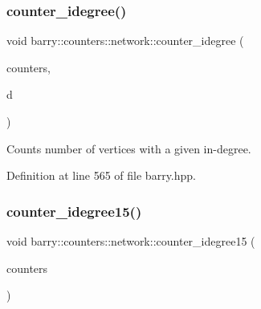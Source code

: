 \mbox{\label{namespacebarry_1_1counters_1_1network_ab87617883960a1fc818048036fb13b83}} 
\subsubsection{\texorpdfstring{counter\+\_\+idegree()}{counter\_idegree()}}
{\footnotesize\ttfamily void barry\+::counters\+::network\+::counter\+\_\+idegree (\begin{DoxyParamCaption}\item[{\hyperlink{namespacebarry_1_1counters_1_1network_a3b3c590303d47840d1967372ae495d95}{Net\+Counter\+Vector} $\ast$}]{counters,  }\item[{std\+::vector$<$ \hyperlink{namespacebarry_a11dfc53ddb4672278319aa04f1e09a6c}{uint} $>$}]{d }\end{DoxyParamCaption})\hspace{0.3cm}{\ttfamily [inline]}}



Counts number of vertices with a given in-\/degree. 



Definition at line 565 of file barry.\+hpp.

\mbox{\label{namespacebarry_1_1counters_1_1network_a148e6fbb549eea53ff6d744b0f683ed6}} 
\subsubsection{\texorpdfstring{counter\+\_\+idegree15()}{counter\_idegree15()}}
{\footnotesize\ttfamily void barry\+::counters\+::network\+::counter\+\_\+idegree15 (\begin{DoxyParamCaption}\item[{\hyperlink{namespacebarry_1_1counters_1_1network_a3b3c590303d47840d1967372ae495d95}{Net\+Counter\+Vector} $\ast$}]{counters }\end{DoxyParamCaption})\hspace{0.3cm}{\ttfamily [inline]}}



